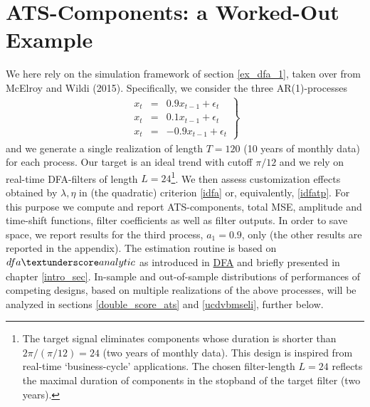 \documentclass[a4paper]{book}
\begin{document}
\section{ATS-Components: a Worked-Out Example}\label{ats_work_o}


We here rely on the simulation framework of section \ref{ex_dfa_1}, taken over from McElroy and Wildi (2015). Specifically, we consider the three AR(1)-processes 
\begin{eqnarray}
\left.\begin{array}{ccc}x_t&=&0.9x_{t-1}+\epsilon_t\\
x_t&=&0.1x_{t-1}+\epsilon_t\\
x_t&=&-0.9x_{t-1}+\epsilon_t
\end{array}\right\}\label{ar1_processes}
\end{eqnarray}
and we generate a single realization of length $T=120$ (10 years of monthly data) for each process. Our target is an ideal trend with cutoff $\pi/12$ and we rely on real-time DFA-filters of length $L=24$\footnote{The target signal eliminates components whose duration is shorter than $2\pi/(\pi/12)=24$ (two years of monthly data). This design is inspired from real-time `business-cycle' applications. The chosen filter-length $L=24$ reflects the maximal duration of components in the stopband of the target filter (two years).}. We then assess customization effects obtained by $\lambda,\eta$ in (the quadratic) criterion \ref{idfa} or, equivalently, \ref{idfatp}. For this purpose we compute and report ATS-components, total MSE, amplitude and time-shift functions, filter coefficients as well as filter outputs. In order to save space, we report results for the third process, $a_1=0.9$, only (the other results are reported in the appendix). The estimation routine is based on $dfa\textunderscore analytic$ as introduced in \href{http://blog.zhaw.ch/sef/files/2014/10/DFA.pdf}{DFA} and briefly presented in chapter \ref{intro_sec}. In-sample and out-of-sample distributions of performances of competing designs, based on multiple realizations of the above processes, will be analyzed in sections \ref{double_score_ats} and \ref{ucdvbmseli}, further below.
\end{document}
